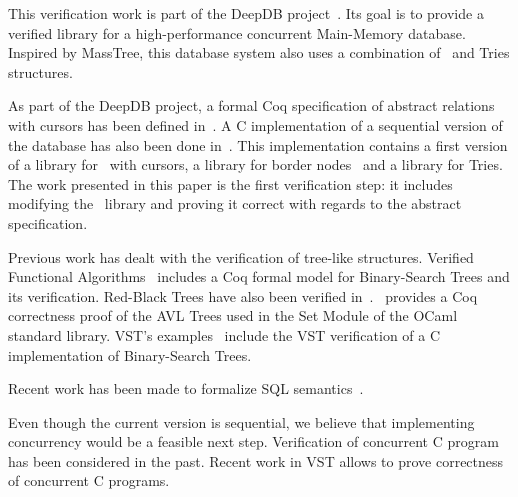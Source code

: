 This verification work is part of the DeepDB project~\cite{deepdb}.
Its goal is to provide a verified library for a high-performance concurrent Main-Memory database.
Inspired by MassTree, this database system also uses a combination of \btrees\ and Tries structures.

As part of the DeepDB project, a formal Coq specification of abstract relations with cursors has been defined in~\cite{brian}.
A C implementation of a sequential version of the database has also been done in~\cite{tosin}.
This implementation contains a first version of a library for \btrees\ with cursors, a library for border nodes~\cite{masstree} and a library for Tries.
The work presented in this paper is the first verification step: it includes modifying the \btrees\ library and proving it correct with regards to the abstract specification.

Previous work has dealt with the verification of tree-like structures.
Verified Functional Algorithms~\cite{vfa} includes a Coq formal model for Binary-Search Trees and its verification.
Red-Black Trees have also been verified in~\cite{redblack}. \cite{functors}~provides a Coq correctness proof of the AVL Trees used in the Set Module of the OCaml standard library.
VST's examples~\cite{vst} include the VST verification of a C implementation of Binary-Search Trees.

Recent work has been made to formalize SQL semantics~\cite{coqsql}.

Even though the current version is sequential, we believe that implementing concurrency would be a feasible next step.
Verification of concurrent C program has been considered in the past.
Recent work in VST allows to prove correctness of concurrent C programs.


